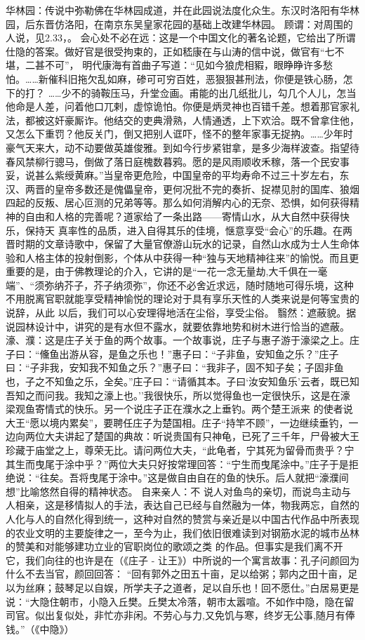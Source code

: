 \documentclass[]{book}
\begin{document}
华林园：传说中弥勒佛在华林园成道，并在此园说法度化众生。东汉时洛阳有华林园，后东晋仿洛阳，在南京东吴皇家花园的基础上改建华林园。
顾谓：对周围的人说，见2.33，。
会心处不必在远：这是一个中国文化的著名论题，它给出了所谓仕隐的答案。做好官是很受拘束的，正如嵇康在与山涛的信中说，做官有``七不堪，二甚不可''，
明代康海有首曲子写道：``见如今狼虎相豭，眼睁睁许多愁怕。\ldots{}\ldots{}新催科旧拖欠乱如麻，碜可可穷百姓，恶狠狠甚刑法，你便是铁心肠，怎下的打？
\ldots{}\ldots{}少不的骑鞍压马，升堂佥画。甫能的出几纸批儿，勾几个人儿，怎当他命是人差，问着他口兀剌，虚惊诡怕。你便是炳灵神也百错千差。想着那官家礼法，都被这奸豪厮诈。他结交的吏典滑熟，人情通透，上下欢洽。既不曾拿住他，又怎么下重罚？他反关门，倒又把别人诓吓，怪不的整年家事无捉抐。\ldots{}\ldots{}少年时豪气天来大，动不动要做英雄俊雅。到如今行步紧钳拿，是多少海样波查。指望待春风禁柳行骢马，倒做了落日庭槐数暮鸦。愿的是风雨顺收禾稼，落一个民安事妥，说甚么紫绶黄麻。''当皇帝更危险，中国皇帝的平均寿命不过三十岁左右，东汉、两晋的皇帝多数还是傀儡皇帝，更何况批不完的奏折、捉襟见肘的国库、狼烟四起的反叛、居心叵测的兄弟等等。那么如何消解内心的无奈、恐惧，如何获得精神的自由和人格的完善呢？道家给了一条出路------寄情山水，从大自然中获得快乐，保持天
真率性的品质，进入自得其乐的佳境，惬意享受``会心''的乐趣。在两晋时期的文章诗歌中，保留了大量官僚游山玩水的记录，自然山水成为士人生命体验和人格主体的投射倒影，个体从中获得一种``独与天地精神往来''的愉悦。而且更重要的是，由于佛教理论的介入，它讲的是``一花一念无量劫,大千俱在一毫端''、``须弥纳芥子，芥子纳须弥''，你还不必舍近求远，随时随地可得乐境，这种不用脱离官职就能享受精神愉悦的理论对于具有享乐天性的人类来说是何等宝贵的说辞，从此
以后，我们可以心安理得地活在尘俗，享受尘俗。
翳然：遮蔽貌。据说园林设计中，讲究的是有水但不露水，就要依靠地势和树木进行恰当的遮蔽。
濠、濮：这是庄子关于鱼的两个故事。一个故事说，庄子与惠子游于濠梁之上。庄子曰：``儵鱼出游从容，是鱼之乐也！''惠子曰：``子非鱼，安知鱼之乐？''庄子曰：``子非我，安知我不知鱼之乐？''惠子曰：``我非子，固不知子矣；子固非鱼也，子之不知鱼之乐，全矣。''庄子曰：``请循其本。子曰`汝安知鱼乐'云者，既已知吾知之而问我。我知之濠上也。''我很快乐，所以觉得鱼也一定很快乐，这是在濠梁观鱼寄情式的快乐。另一个说庄子正在濮水之上垂钓。两个楚王派来
的使者说大王``愿以境内累矣''，要聘任庄子为楚国相。庄子``持竿不顾''，一边继续垂钓，一边向两位大夫讲起了楚国的典故：听说贵国有只神龟，已死了三千年，尸骨被大王珍藏于庙堂之上，尊荣无比。请问两位大夫，``此龟者，宁其死为留骨而贵乎？宁其生而曳尾于涂中乎？''两位大夫只好按常理回答：``宁生而曳尾涂中。''庄子于是拒绝说：``往矣。吾将曳尾于涂中。''这是做自由自在的鱼的快乐。后人就把``濠濮间想''比喻悠然自得的精神状态。
自来亲人：不
说人对鱼鸟的亲切，而说鸟主动与人相亲，这是移情拟人的手法，表达自己已经与自然融为一体，物我两忘，自然的人化与人的自然化得到统一，这种对自然的赞赏与亲近是以中国古代作品中所表现的农业文明的主要旋律之一，至今为止，我们依旧很难读到对钢筋水泥的城市丛林的赞美和对能够建功立业的官职岗位的歌颂之类
的作品。但事实是我们离不开它，我们向往的也许是在（《庄子 -
让王》）中所说的一个寓言故事：孔子问颜回为什么不去当官，颜回回答：
``回有郭外之田五十亩，足以给粥；郭内之田十亩，足以为丝麻；鼓琴足以自娱，所学夫子之道者，足以自乐也！回不愿仕。''白居易更是说：``大隐住朝市，小隐入丘樊。丘樊太冷落，朝市太嚣喧。不如作中隐，隐在留司官。似出复似处，非忙亦非闲。不劳心与力,又免饥与寒，终岁无公事,随月有俸钱。''（《中隐》）
\end{document}
